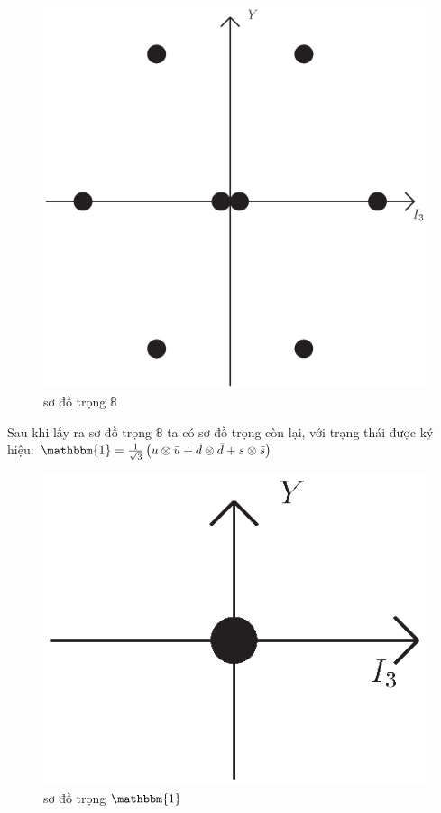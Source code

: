\documentclass{report}
\begin{document}
	\begin{figure}[!htb]
		\centering
		\includegraphics[scale=0.5]{diagram1.eps}
		\caption{sơ đồ trọng \(\mathbb{8}\)}
	\end{figure}

Sau khi lấy ra sơ đồ trọng \( \mathbb{8} \) ta có sơ đồ trọng còn lại, với trạng thái được ký hiệu: \( \mathbbm{1} = \frac{1}{\sqrt{3}} \left( u \otimes \bar{u} + d \otimes \bar{d} + s \otimes \bar{s} \right) \)

	\begin{figure}[!htb]
		\centering
		\includegraphics[scale=0.5]{diagram0.eps}
		\caption{sơ đồ trọng \( \mathbbm{1} \)}
	\end{figure}
\end{document}
